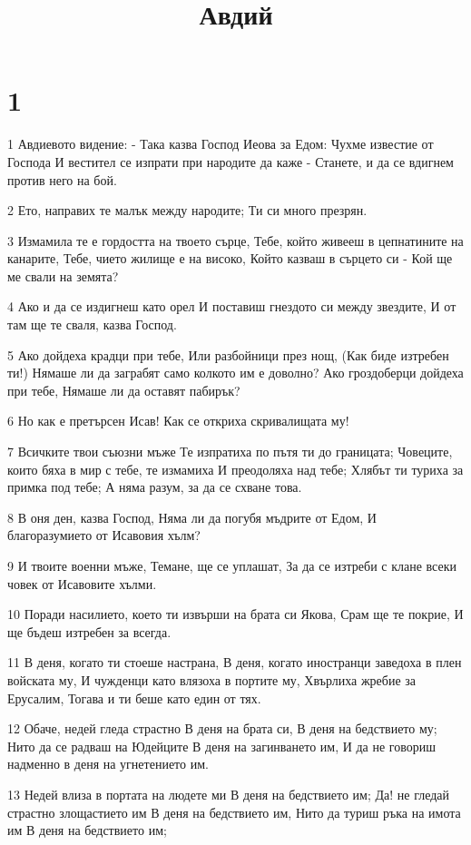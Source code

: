 

\title{Авдий}


\chapter{1}

\par 1 Авдиевото видение: - Така казва Господ Иеова за Едом: Чухме известие от Господа И вестител се изпрати при народите да каже -  Станете, и да се вдигнем против него на бой.
\par 2 Ето, направих те малък между народите; Ти си много презрян.
\par 3 Измамила те е гордостта на твоето сърце, Тебе, който живееш в цепнатините на канарите, Тебе, чието жилище е на високо, Който казваш в сърцето си -  Кой ще ме свали на земята?
\par 4 Ако и да се издигнеш като орел И поставиш гнездото си между звездите, И от там ще те сваля, казва Господ.
\par 5 Ако дойдеха крадци при тебе, Или разбойници през нощ, (Как биде изтребен ти!) Нямаше ли да заграбят само колкото им е доволно? Ако гроздоберци дойдеха при тебе, Нямаше ли да оставят пабирък?
\par 6 Но как е претърсен Исав! Как се откриха скривалищата му!
\par 7 Всичките твои съюзни мъже Те изпратиха по пътя ти до границата; Човеците, които бяха в мир с тебе, те измамиха И преодоляха над тебе; Хлябът ти туриха за примка под тебе; А няма разум, за да се схване това.
\par 8 В оня ден, казва Господ, Няма ли да погубя мъдрите от Едом, И благоразумието от Исавовия хълм?
\par 9 И твоите военни мъже, Темане, ще се уплашат, За да се изтреби с клане всеки човек от Исавовите хълми.
\par 10 Поради насилието, което ти извърши на брата си Якова, Срам ще те покрие, И ще бъдеш изтребен за всегда.
\par 11 В деня, когато ти стоеше настрана, В деня, когато иностранци заведоха в плен войската му, И чужденци като влязоха в портите му, Хвърлиха жребие за Ерусалим, Тогава и ти беше като един от тях.
\par 12 Обаче, недей гледа страстно В деня на брата си, В деня на бедствието му; Нито да се радваш на Юдейците В деня на загинването им, И да не говориш надменно в деня на угнетението им.
\par 13 Недей влиза в портата на людете ми В деня на бедствието им; Да! не гледай страстно злощастието им В деня на бедствието им, Нито да туриш ръка на имота им В деня на бедствието им;
